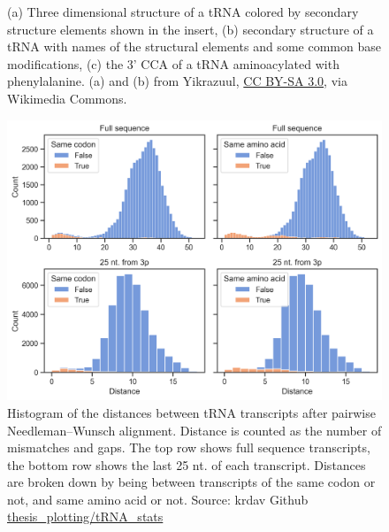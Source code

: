 \begin{figure}
\begin{subfigure}[b]{0.2\textwidth}
         \caption{}
         \label{fig:tRNA_CCAester}
     \end{subfigure}
        \caption{
        (a) Three dimensional structure of a tRNA colored by secondary structure elements shown in the insert, (b) secondary structure of a tRNA with names of the structural elements and some common base modifications, (c) the 3' CCA of a tRNA aminoacylated with phenylalanine.
        (a) and (b) from Yikrazuul, \href{https://creativecommons.org/licenses/by-sa/3.0}{CC BY-SA 3.0}, via Wikimedia Commons.
        }
\end{figure}





\begin{figure}
    \centering
    \includegraphics[width=\textwidth]{figures/chap3/tRNA_dist_hist.png}
    \caption{Histogram of the distances between tRNA transcripts after pairwise Needleman–Wunsch alignment. Distance is counted as the number of mismatches and gaps. The top row shows full sequence transcripts, the bottom row shows the last 25 nt. of each transcript. Distances are broken down by being between transcripts of the same codon or not, and same amino acid or not. Source: krdav Github \href{https://github.com/krdav/thesis_plotting/blob/main/tRNA_stats/plot_data.ipynb}{thesis\_plotting/tRNA\_stats}}
    \label{fig:dist_hist}
\end{figure}




